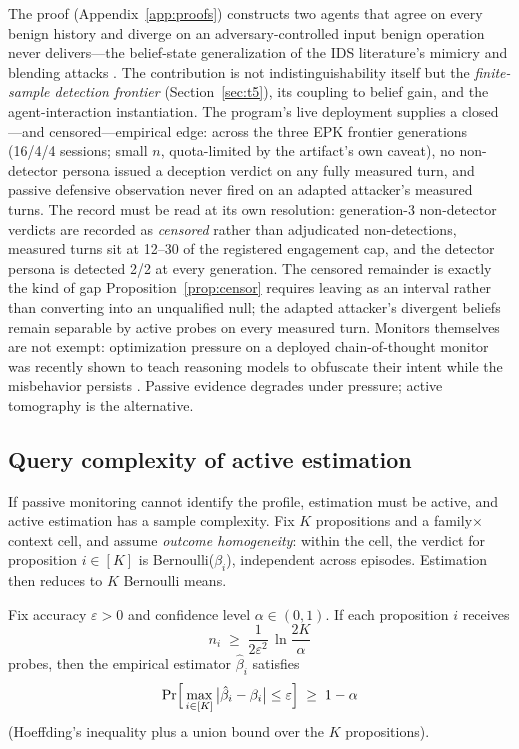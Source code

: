 The proof (Appendix~\ref{app:proofs}) constructs two agents that agree on
every benign history and diverge on an adversary-controlled input benign
operation never delivers---the belief-state generalization of the IDS
literature's mimicry and blending attacks
\cite{wagner2002,fogla2006}. The contribution is not indistinguishability
itself but the \emph{finite-sample detection frontier}
(Section~\ref{sec:t5}), its coupling to belief gain, and the
agent-interaction instantiation. The program's
live deployment supplies a closed---and censored---empirical edge: across the
three EPK frontier generations (16/4/4 sessions; small $n$,
quota-limited by the artifact's own caveat), no non-detector persona issued
a deception verdict on any fully measured turn, and passive defensive
observation never fired on an adapted attacker's measured turns. The
record must be read at its own resolution: generation-3 non-detector
verdicts are recorded as \emph{censored} rather than adjudicated
non-detections, measured turns sit at 12--30 of the registered engagement
cap, and the detector persona is detected 2/2 at every generation. The
censored remainder is exactly the kind of gap Proposition~\ref{prop:censor}
requires leaving as an interval rather than converting into an unqualified
null; the adapted attacker's divergent beliefs remain separable by active
probes on every measured turn. Monitors themselves are not
exempt: optimization pressure on a deployed chain-of-thought monitor was
recently shown to teach reasoning models to obfuscate their intent while the
misbehavior persists \cite{baker2025monitoring}. Passive evidence degrades
under pressure; active tomography is the alternative.

\subsection{Query complexity of active estimation}\label{sec:qc}

If passive monitoring cannot identify the profile, estimation must be
active, and active estimation has a sample complexity. Fix $K$ propositions
and a family$\times$context cell, and assume \emph{outcome homogeneity}:
within the cell, the verdict for proposition $i\in[K]$ is Bernoulli($\beta_i$),
independent across episodes. Estimation then reduces to $K$ Bernoulli means.

\begin{theorem}\label{thm:uniform}
Fix accuracy $\varepsilon>0$ and confidence level $\alpha\in(0,1)$. If each
proposition $i$ receives
\[
n_i \;\ge\; \frac{1}{2\varepsilon^{2}}\,\ln\frac{2K}{\alpha}
\]
probes, then the empirical estimator $\hat\beta_i$ satisfies
\[
\Pr\Bigl[\,\max_{i\in[K]}\,\bigl|\hat\beta_i-\beta_i\bigr|\le\varepsilon
\Bigr]\;\ge\;1-\alpha
\]
(Hoeffding's inequality \cite{hoeffding1963} plus a union bound over the $K$
propositions).
\end{theorem}

